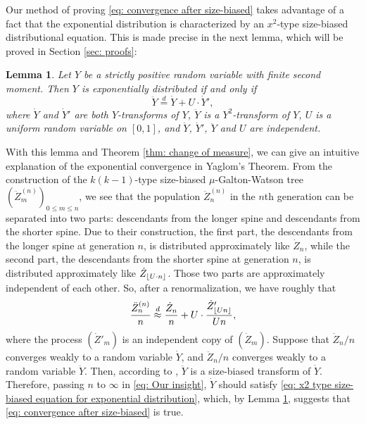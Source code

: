 \documentclass[12pt,a4paper]{amsart}
\DeclarePairedDelimiter\floor{\lfloor}{\rfloor}
\newtheorem{lem}[thm]{Lemma}
\numberwithin{equation}{section}
\begin{document}
	Our method of proving
	\eqref{eq: convergence after size-biased}
	takes advantage of a fact that the exponential distribution is characterized by an $x^2$-type size-biased distributional equation.
	This is made precise in the next lemma, which will be proved in Section \ref{sec: proofs}:
\begin{lem} \label{lem: our equation}
	Let $Y$ be a strictly positive random variable with finite second moment.
	Then $Y$ is exponentially distributed if and only if
\begin{equation}
\label{eq: x2 type size-biased equation for exponential distribution}
	\ddot Y \overset{d}
	= \dot Y + U \cdot \dot Y',
\end{equation}
 where $\dot Y$ and $\dot Y'$ are both $Y$-transforms of  $Y$,
$\ddot Y$ is a $Y^2$-transform of $Y$,
	$U$ is a uniform random variable on $[0,1]$, and $\dot Y$, $\dot Y'$, $\ddot Y$
	and $U$ are independent.
\end{lem}	
	With this lemma and Theorem \ref{thm: change of measure}, we can give an intuitive explanation of the exponential convergence in Yaglom's Theorem.
	From the construction of the $k(k-1)$-type size-biased $\mu$-Galton-Watson tree $(\ddot Z^{(n)}_m)_{0\le m\le n}$, we see that the population $\ddot Z^{(n)}_n$ in the $n$th generation can be separated into two parts: descendants
	from the longer spine and descendants from the shorter spine.
	Due to their construction,
	the first part, the descendants from the longer spine at generation $n$,
	is distributed approximately like $\dot Z_n$,
	while the second part, the descendants from the shorter spine at generation $n$, is distributed approximately like $\dot Z_{ \floor{U\cdot n}}$.
	Those two parts are approximately independent of each other.
	So, after a renormalization, we have roughly that
\begin{equation}
\label{eq: Our insight}
	\frac{\ddot Z_n^{(n)}}{n}
	\overset{d} \approx \frac{\dot Z_n}{n} +
	U \cdot \frac{   \dot Z'_{  \floor{ U n }  }   }    {   Un   },
\end{equation}
	where the process $(\dot Z'_m)$ is an independent copy of $(\dot Z_m)$.
	Suppose that $\dot Z_n/n$ converges weakly to a random variable $\dot Y$, and $\ddot Z_n/n$ converges weakly to a random variable $\ddot Y$. 
	Then, according to \cite[Lemma 4.3]{lyons1995conceptual}, $\ddot Y$ is a size-biased transform of $\dot Y$. 
	Therefore, passing $n$ to $\infty$ in \eqref{eq: Our insight}, $\dot Y$ should satisfy \eqref{eq: x2 type size-biased equation for exponential distribution}, which, by Lemma \ref{lem: our equation}, suggests that \eqref{eq: convergence after size-biased} is true.
	
\end{document}
